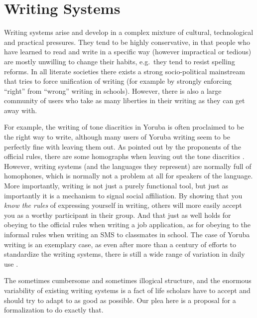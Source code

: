 \chapter{Writing Systems}
\label{writing_systems}


Writing systems arise and develop in a complex mixture of cultural, technological and practical pressures. They tend to be highly conservative, in that people who have learned to read and write in a specific way (however impractical or tedious) are mostly unwilling to change their habits, e.g.~they tend to resist spelling reforms. In all literate societies there exists a strong socio-political mainstream that tries to force unification of writing (for example by strongly enforcing ``right'' from ``wrong'' writing in schools). However, there is also a large community of users who take as many liberties in their writing as they can get away with.

For example, the writing of tone diacritics in Yoruba is often proclaimed to be the right way to write, although many users of Yoruba writing seem to be perfectly fine with leaving them out. As pointed out by the proponents of the official rules, there are some homographs when leaving out the tone diacritics \citet[44]{Olumuyiw2013}. However, writing systems (and the languages they represent) are normally full of homophones, which is normally not a problem at all for speakers of the language. More importantly, writing is not just a purely functional tool, but just as importantly it is a mechanism to signal social affiliation. By showing that you \textit{know the rules} of expressing yourself in writing, others will more easily accept you as a worthy participant in their group. And that just as well holds for obeying to the official rules when writing a job application, as for obeying to the informal rules when writing an SMS to classmates in school. The case of Yoruba writing is an exemplary case, as even after more than a century of efforts to standardize the writing systems, there is still a wide range of variation in daily use \citet{Olumuyiw2013}.

The sometimes cumbersome and sometimes illogical structure, and the enormous variability of existing writing systems is a fact of life scholars have to accept and should try to adapt to as good as possible. Our plea here is a proposal for a formalization to do exactly that.


